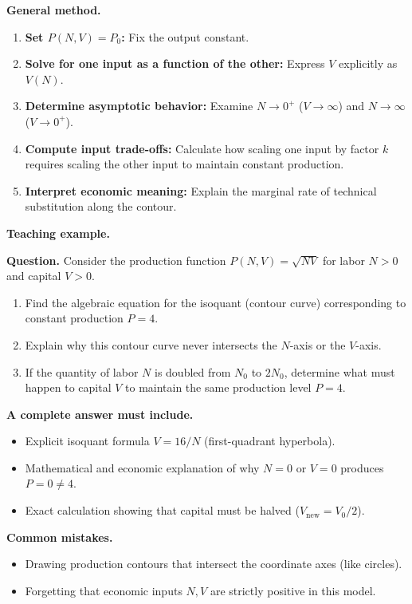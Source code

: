 \documentclass[11pt,letterpaper]{article}
\begin{document}
\textbf{General method.}
\begin{enumerate}[leftmargin=*,nosep]
    \item \textbf{Set $P(N,V) = P_0$:} Fix the output constant.
    \item \textbf{Solve for one input as a function of the other:} Express $V$ explicitly as $V(N)$.
    \item \textbf{Determine asymptotic behavior:} Examine $N \to 0^+$ ($V \to \infty$) and $N \to \infty$ ($V \to 0^+$).
    \item \textbf{Compute input trade-offs:} Calculate how scaling one input by factor $k$ requires scaling the other input to maintain constant production.
    \item \textbf{Interpret economic meaning:} Explain the marginal rate of technical substitution along the contour.
\end{enumerate}

\textbf{Teaching example.}

\textbf{Question.} 
Consider the production function $P(N,V) = \sqrt{NV}$ for labor $N > 0$ and capital $V > 0$.
\begin{enumerate}[label=(\alph*),nosep]
    \item Find the algebraic equation for the isoquant (contour curve) corresponding to constant production $P = 4$.
    \item Explain why this contour curve never intersects the $N$-axis or the $V$-axis.
    \item If the quantity of labor $N$ is doubled from $N_0$ to $2N_0$, determine what must happen to capital $V$ to maintain the same production level $P = 4$.
\end{enumerate}

\textbf{A complete answer must include.}
\begin{itemize}[leftmargin=*,nosep]
    \item Explicit isoquant formula $V = 16/N$ (first-quadrant hyperbola).
    \item Mathematical and economic explanation of why $N=0$ or $V=0$ produces $P=0 \ne 4$.
    \item Exact calculation showing that capital must be halved ($V_{\text{new}} = V_0/2$).
\end{itemize}

\textbf{Common mistakes.}
\begin{itemize}[leftmargin=*,nosep]
    \item Drawing production contours that intersect the coordinate axes (like circles).
    \item Forgetting that economic inputs $N, V$ are strictly positive in this model.
\end{itemize}
\end{document}
